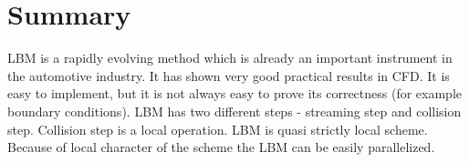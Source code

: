 
\section{Summary}

LBM is a rapidly evolving method which is already an important instrument in the automotive industry. It has shown very good practical results in CFD. It is easy to implement, but it is not always easy to prove its correctness (for example boundary conditions). LBM has two different steps - streaming step and collision step. Collision step is a local operation. LBM is quasi strictly local scheme. Because of local character of the scheme the LBM can be easily parallelized.
